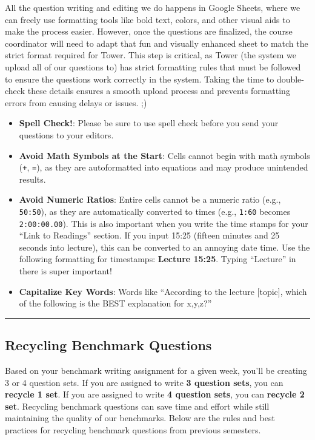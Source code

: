 \documentclass[
]{article}
\providecommand{\tightlist}{%
  \setlength{\itemsep}{0pt}\setlength{\parskip}{0pt}}
\begin{document}
All the question writing and editing we do happens in Google Sheets, where we can freely use formatting tools like bold text, colors, and other visual aids to make the process easier. However, once the questions are finalized, the course coordinator will need to adapt that fun and visually enhanced sheet to match the strict format required for Tower. This step is critical, as Tower (the system we upload all of our questions to) has strict formatting rules that must be followed to ensure the questions work correctly in the system. Taking the time to double-check these details ensures a smooth upload process and prevents formatting errors from causing delays or issues. ;)

\begin{itemize}
\tightlist
\item
  \textbf{Spell Check!}: Please be sure to use spell check before you send your questions to your editors.
\item
  \textbf{Avoid Math Symbols at the Start}: Cells cannot begin with math symbols (\texttt{+}, \texttt{=}), as they are autoformatted into equations and may produce unintended results.
\item
  \textbf{Avoid Numeric Ratios}: Entire cells cannot be a numeric ratio (e.g., \texttt{50:50}), as they are automatically converted to times (e.g., \texttt{1:60} becomes \texttt{2:00:00.00}). This is also important when you write the time stamps for your ``Link to Readings'' section. If you input 15:25 (fifteen minutes and 25 seconds into lecture), this can be converted to an annoying date time. Use the following formatting for timestamps: \textbf{Lecture 15:25}. Typing ``Lecture'' in there is super important!
\item
  \textbf{Capitalize Key Words}: Words like ``According to the lecture {[}topic{]}, which of the following is the BEST explanation for x,y,z?''
\end{itemize}

\begin{center}\rule{0.5\linewidth}{0.5pt}\end{center}

\hypertarget{recycling-benchmark-questions}{%
\subsection{Recycling Benchmark Questions}\label{recycling-benchmark-questions}}

Based on your benchmark writing assignment for a given week, you'll be creating 3 or 4 question sets. If you are assigned to write \textbf{3 question sets}, you can \textbf{recycle 1 set}. If you are assigned to write \textbf{4 question sets}, you can \textbf{recycle 2 set}. Recycling benchmark questions can save time and effort while still maintaining the quality of our benchmarks. Below are the rules and best practices for recycling benchmark questions from previous semesters.
\end{document}
